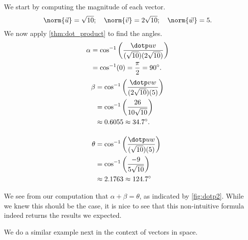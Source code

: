 {We start by computing the magnitude of each vector.
$$\norm{\vec u} = \sqrt{10};\quad \norm{\vec v} = 2\sqrt{10};\quad \norm{\vec w} = 5.$$
We now apply \autoref{thm:dot_product} to find the angles.
\begin{align*}
	\alpha &= \cos^{-1}\left(\frac{\dotp uv}{(\sqrt{10})(2\sqrt{10})}\right) \\
	&= \cos^{-1}(0) = \frac{\pi}2 = 90^\circ.
\end{align*}
\begin{align*}
	\beta &= \cos^{-1}\left(\frac{\dotp vw}{(2\sqrt{10})(5)}\right) \\
	&= \cos^{-1}\left(\frac{26}{10\sqrt{10}}\right) \\
	&\approx 0.6055 \approx 34.7^\circ.\\[10pt]
	\theta &= \cos^{-1}\left(\frac{\dotp uw}{(\sqrt{10})(5)}\right) \\
	&= \cos^{-1}\left(\frac{-9}{5\sqrt{10}}\right) \\
	&\approx 2.1763 \approx 124.7^\circ
\end{align*}}

We see from our computation that $\alpha + \beta = \theta$, as indicated by \autoref{fig:dotp2}. While we knew this should be the case, it is nice to see that this non-intuitive formula indeed returns the results we expected.

We do a similar example next in the context of vectors in space.

%


